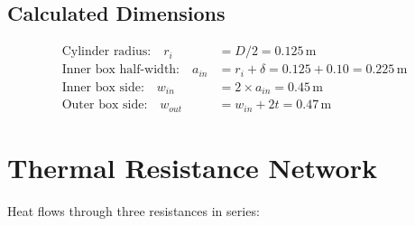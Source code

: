 \documentclass[11pt]{article}
\newcommand{\unit}[1]{\,\mathrm{#1}}
\begin{document}
\subsection{Calculated Dimensions}

\begin{align}
    \text{Cylinder radius:} \quad r_i &= D/2 = 0.125\unit{m} \\
    \text{Inner box half-width:} \quad a_{in} &= r_i + \delta = 0.125 + 0.10 = 0.225\unit{m} \\
    \text{Inner box side:} \quad w_{in} &= 2 \times a_{in} = 0.45\unit{m} \\
    \text{Outer box side:} \quad w_{out} &= w_{in} + 2t = 0.47\unit{m}
\end{align}

\section{Thermal Resistance Network}

Heat flows through three resistances in series:
\end{document}
